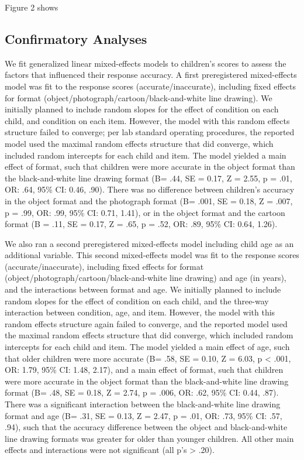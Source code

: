 \documentclass[10pt, letterpaper]{article}
\begin{document}
Figure 2 shows

\subsection{Confirmatory Analyses}\label{confirmatory-analyses}

We fit generalized linear mixed-effects models to children's scores to
assess the factors that influenced their response accuracy. A first
preregistered mixed-effects model was fit to the response scores
(accurate/inaccurate), including fixed effects for format
(object/photograph/cartoon/black-and-white line drawing). We initially
planned to include random slopes for the effect of condition on each
child, and condition on each item. However, the model with this random
effects structure failed to converge; per lab standard operating
procedures, the reported model used the maximal random effects structure
that did converge, which included random intercepts for each child and
item. The model yielded a main effect of format, such that children were
more accurate in the object format than the black-and-white line drawing
format (B= .44, SE = 0.17, Z = 2.55, p = .01, OR: .64, 95\% CI: 0.46,
.90). There was no difference between children's accuracy in the object
format and the photograph format (B= .001, SE = 0.18, Z = .007, p = .99,
OR: .99, 95\% CI: 0.71, 1.41), or in the object format and the cartoon
format (B = .11, SE = 0.17, Z = .65, p = .52, OR: .89, 95\% CI: 0.64,
1.26).

We also ran a second preregistered mixed-effects model including child
age as an additional variable. This second mixed-effects model was fit
to the response scores (accurate/inaccurate), including fixed effects
for format (object/photograph/cartoon/black-and-white line drawing) and
age (in years), and the interactions between format and age. We
initially planned to include random slopes for the effect of condition
on each child, and the three-way interaction between condition, age, and
item. However, the model with this random effects structure again failed
to converge, and the reported model used the maximal random effects
structure that did converge, which included random intercepts for each
child and item. The model yielded a main effect of age, such that older
children were more accurate (B= .58, SE = 0.10, Z = 6.03, p \textless{}
.001, OR: 1.79, 95\% CI: 1.48, 2.17), and a main effect of format, such
that children were more accurate in the object format than the
black-and-white line drawing format (B= .48, SE = 0.18, Z = 2.74, p =
.006, OR: .62, 95\% CI: 0.44, .87). There was a significant interaction
between the black-and-white line drawing format and age (B= .31, SE =
0.13, Z = 2.47, p = .01, OR: .73, 95\% CI: .57, .94), such that the
accuracy difference between the object and black-and-white line drawing
formats was greater for older than younger children. All other main
effects and interactions were not significant (all p's \textgreater{}
.20).
\end{document}
